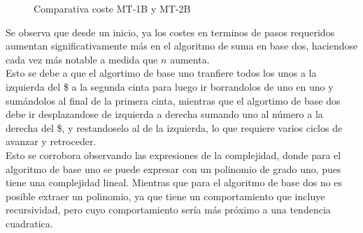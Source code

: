 \begin{figure}[h]
    \centering
    
    \caption{Comparativa coste MT-1B y MT-2B}
\end{figure}

Se observa que desde un inicio, ya los costes en terminos de pasos requeridos aumentan significativamente más en el algoritmo de suma en base dos, haciendose cada vez más notable a medida que $n$ aumenta.\\
Esto se debe a que el algortimo de base uno tranfiere todos los unos a la izquierda del \$ a la segunda cinta para luego ir borrandolos de uno en uno y sumándolos al final de la primera cinta, mientras que el algortimo de base dos debe ir desplazandose de izquierda a derecha sumando uno al número a la derecha del \$, y restandoselo al de la izquierda, lo que requiere varios ciclos de avanzar y retroceder.\\
Esto se corrobora observando las expresiones de la complejidad, donde para el algoritmo de base uno se puede expresar con un polinomio de grado uno, pues tiene una complejidad lineal. Mientras que para el algoritmo de base dos no es posible extraer un polinomio, ya que tiene un comportamiento que incluye recursividad, pero cuyo comportamiento sería más próximo a una tendencia cuadratica.
